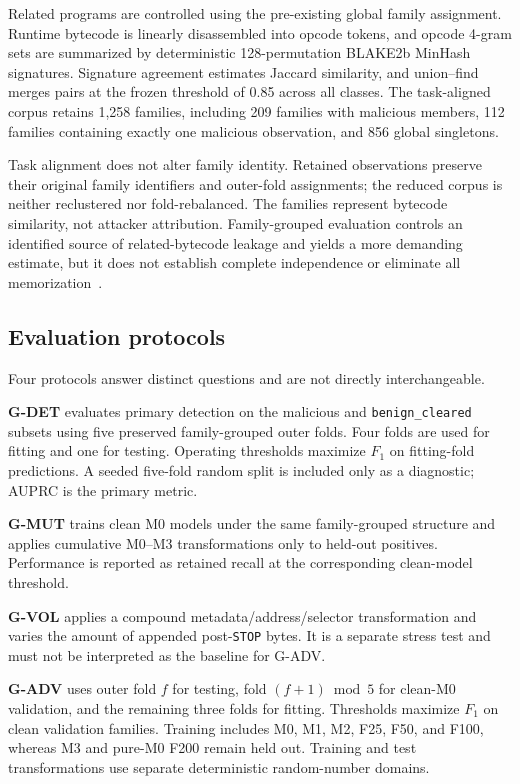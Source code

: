 \documentclass[conference]{IEEEtran}
\begin{document}
Related programs are controlled using the pre-existing global family assignment. Runtime bytecode is linearly disassembled into opcode tokens, and opcode 4-gram sets are summarized by deterministic 128-permutation BLAKE2b MinHash signatures. Signature agreement estimates Jaccard similarity, and union--find merges pairs at the frozen threshold of 0.85 across all classes. The task-aligned corpus retains 1,258 families, including 209 families with malicious members, 112 families containing exactly one malicious observation, and 856 global singletons.

Task alignment does not alter family identity. Retained observations preserve their original family identifiers and outer-fold assignments; the reduced corpus is neither reclustered nor fold-rebalanced. The families represent bytecode similarity, not attacker attribution. Family-grouped evaluation controls an identified source of related-bytecode leakage and yields a more demanding estimate, but it does not establish complete independence or eliminate all memorization~\cite{pendlebury2019tesseract}.

\subsection{Evaluation protocols}

Four protocols answer distinct questions and are not directly interchangeable.

\textbf{G-DET} evaluates primary detection on the malicious and \texttt{benign\_cleared} subsets using five preserved family-grouped outer folds. Four folds are used for fitting and one for testing. Operating thresholds maximize $F_1$ on fitting-fold predictions. A seeded five-fold random split is included only as a diagnostic; AUPRC is the primary metric.

\textbf{G-MUT} trains clean M0 models under the same family-grouped structure and applies cumulative M0--M3 transformations only to held-out positives. Performance is reported as retained recall at the corresponding clean-model threshold.

\textbf{G-VOL} applies a compound metadata/address/selector transformation and varies the amount of appended post-\texttt{STOP} bytes. It is a separate stress test and must not be interpreted as the baseline for G-ADV.

\textbf{G-ADV} uses outer fold $f$ for testing, fold $(f+1)\bmod 5$ for clean-M0 validation, and the remaining three folds for fitting. Thresholds maximize $F_1$ on clean validation families. Training includes M0, M1, M2, F25, F50, and F100, whereas M3 and pure-M0 F200 remain held out. Training and test transformations use separate deterministic random-number domains.
\end{document}
